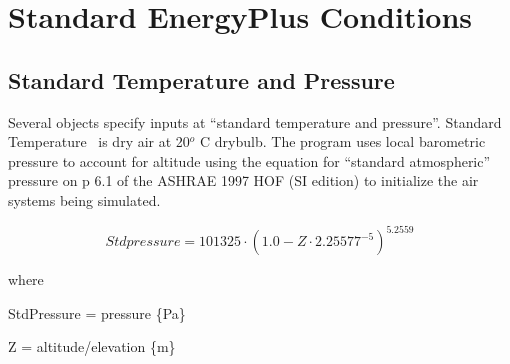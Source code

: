 \section{Standard EnergyPlus Conditions}\label{standard-energyplus-conditions}

\subsection{Standard Temperature and Pressure}\label{standard-temperature-and-pressure}

Several objects specify inputs at ``standard temperature and pressure''. Standard Temperature~ is dry air at 20\(^{o}\) C drybulb. The program uses local barometric pressure to account for altitude using the equation for ``standard atmospheric'' pressure on p 6.1 of the ASHRAE 1997 HOF (SI edition) to initialize the air systems being simulated.

\begin{equation}
Stdpressure = 101325\cdot {\left( {1.0 - Z\cdot {{2.25577}^{ - 5}}} \right)^{5.2559}}
\end{equation}

where

StdPressure = pressure \{Pa\}

Z = altitude/elevation \{m\}
